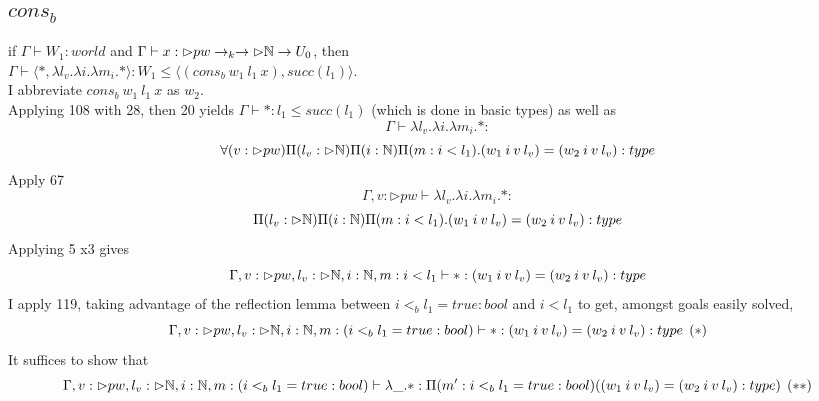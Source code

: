 \message{ !name(paper.tex)}\documentclass{article}
\begin{document}
\subsection{$cons_b$}
if $\Gamma \vdash W_1 : world$ and $\Gamma \vdash x: \rhd pw \rightarrow_k \rightarrow \rhd \mathbb{N} \rightarrow U_0$, then\\ $\Gamma \vdash \langle *, \lambda l_v. \lambda i. \lambda m_i. * \rangle : W_1 \leq \langle (cons_b \:w_1 \: l_1 \:x), succ(l_1) \rangle$.\\
I abbreviate $cons_b \:w_1 \: l_1 \:x$ as $w_2$.\\
Applying 108 with 28, then 20 yields
     $\Gamma \vdash  *: l_1 \leq succ(l_1)$ (which is done in basic types) as well as 
     \[\Gamma \vdash \lambda l_v. \lambda i. \lambda m_i. * : \]
     \[\forall(v: \rhd pw)\Pi(l_v: \rhd \mathbb{N} )\Pi(i: \mathbb{N})\Pi(m: i < l_1).(w_1 \: i \: v \: l_v) = (w_2 \: i \: v \: l_v): type
     \]
     Apply 67 
      \[\Gamma, v: \rhd pw \vdash \lambda l_v. \lambda i. \lambda m_i. * : \]
     \[\Pi(l_v: \rhd \mathbb{N} )\Pi(i: \mathbb{N})\Pi(m: i < l_1).(w_1 \: i \: v \: l_v) = (w_2 \: i \: v \: l_v): type
     \]
     Applying 5 x3 gives 
       \[\Gamma, v: \rhd pw, l_v: \rhd \mathbb{N}, i: \mathbb{N}, m: i < l_1  \vdash  * :  (w_1 \: i \: v \: l_v) = (w_2 \: i \: v \: l_v): type
     \]
     I apply 119, taking advantage of the reflection lemma between $i <_b l_1 = true: bool$ and $i < l_1$ to get, amongst goals easily solved, 
      \[\Gamma, v: \rhd pw, l_v: \rhd \mathbb{N}, i: \mathbb{N}, m: (i <_b l_1 = true : bool)  \vdash  * :  (w_1 \: i \: v \: l_v) = (w_2 \: i \: v \: l_v): type \:\: (*)
     \]
     It suffices to show that
     \[\Gamma, v: \rhd pw, l_v: \rhd \mathbb{N}, i: \mathbb{N}, m: (i <_b l_1 = true : bool)  \vdash  \lambda \_.* : \Pi(m' : i <_b l_1 = true : bool)((w_1 \: i \: v \: l_v) = (w_2 \: i \: v \: l_v) : type) \: \: (**)
     \]
\end{document}
